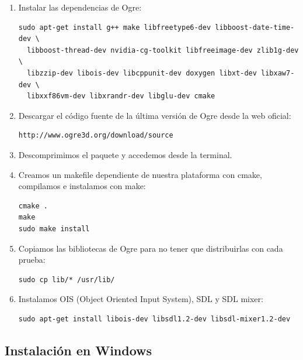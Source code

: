 \documentclass[16pt,spanish]{article}
\begin{document}
\begin{enumerate}
    \item Instalar las dependencias de Ogre:    
    \begin{verbatim}
sudo apt-get install g++ make libfreetype6-dev libboost-date-time-dev \
  libboost-thread-dev nvidia-cg-toolkit libfreeimage-dev zlib1g-dev \
  libzzip-dev libois-dev libcppunit-dev doxygen libxt-dev libxaw7-dev \ 
  libxxf86vm-dev libxrandr-dev libglu-dev cmake
    \end{verbatim}
    \item Descargar el código fuente de la última versión de Ogre desde
    la web oficial:
    \begin{verbatim}
http://www.ogre3d.org/download/source
    \end{verbatim}
    \item Descomprimimos el paquete y accedemos desde la terminal.
    \item Creamos un makefile dependiente de nuestra plataforma con cmake,
    compilamos e instalamos con make:
    \begin{verbatim}
cmake .
make
sudo make install
    \end{verbatim}
    \item Copiamos las bibliotecas de Ogre para no tener que distribuirlas
    con cada prueba:
    \begin{verbatim}
sudo cp lib/* /usr/lib/
    \end{verbatim}    
    \item Instalamos OIS (Object Oriented Input System), SDL y SDL mixer:
    \begin{verbatim}
sudo apt-get install libois-dev libsdl1.2-dev libsdl-mixer1.2-dev
    \end{verbatim} 
\end{enumerate}

\subsection{Instalación en Windows}
\end{document}
